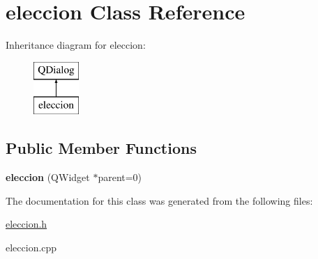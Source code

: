\hypertarget{classeleccion}{\section{eleccion Class Reference}
\label{classeleccion}
}
Inheritance diagram for eleccion\-:\begin{figure}[H]
\begin{center}
\leavevmode
\includegraphics[height=2.000000cm]{classeleccion}
\end{center}
\end{figure}
\subsection*{Public Member Functions}
\begin{DoxyCompactItemize}
\item 
\hypertarget{classeleccion_a9d9a1b39e8e0b70e3388fbdf8f1936c7}{{\bfseries eleccion} (Q\-Widget $\ast$parent=0)}\label{classeleccion_a9d9a1b39e8e0b70e3388fbdf8f1936c7}

\end{DoxyCompactItemize}


The documentation for this class was generated from the following files\-:\begin{DoxyCompactItemize}
\item 
\hyperlink{eleccion_8h}{eleccion.\-h}\item 
eleccion.\-cpp\end{DoxyCompactItemize}
